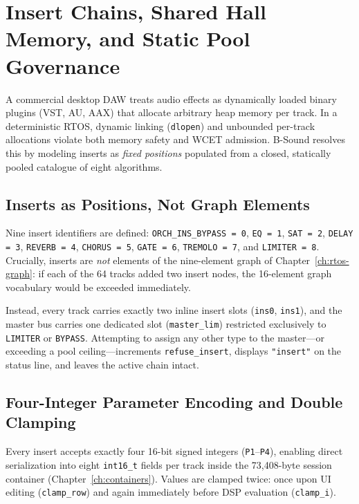 \chapter{Insert Chains, Shared Hall Memory, and Static Pool Governance}
\label{ch:inserts-hall}

A commercial desktop DAW treats audio effects as dynamically loaded binary plugins (VST, AU, AAX) that allocate arbitrary heap memory per track. In a deterministic RTOS, dynamic linking (\texttt{dlopen}) and unbounded per-track allocations violate both memory safety and WCET admission. B-Sound resolves this by modeling inserts as \emph{fixed positions} populated from a closed, statically pooled catalogue of eight algorithms.

\section{Inserts as Positions, Not Graph Elements}

Nine insert identifiers are defined: \texttt{ORCH\_INS\_BYPASS = 0}, \texttt{EQ = 1}, \texttt{SAT = 2}, \texttt{DELAY = 3}, \texttt{REVERB = 4}, \texttt{CHORUS = 5}, \texttt{GATE = 6}, \texttt{TREMOLO = 7}, and \texttt{LIMITER = 8}. Crucially, inserts are \emph{not} elements of the nine-element graph of Chapter~\ref{ch:rtos-graph}: if each of the 64 tracks added two insert nodes, the 16-element graph vocabulary would be exceeded immediately.

Instead, every track carries exactly two inline insert slots (\texttt{ins0}, \texttt{ins1}), and the master bus carries one dedicated slot (\texttt{master\_lim}) restricted exclusively to \texttt{LIMITER} or \texttt{BYPASS}. Attempting to assign any other type to the master—or exceeding a pool ceiling—increments \texttt{refuse\_insert}, displays \texttt{"insert"} on the status line, and leaves the active chain intact.

\section{Four-Integer Parameter Encoding and Double Clamping}

Every insert accepts exactly four 16-bit signed integers (\texttt{P1}--\texttt{P4}), enabling direct serialization into eight \texttt{int16\_t} fields per track inside the 73,408-byte session container (Chapter~\ref{ch:containers}). Values are clamped twice: once upon UI editing (\texttt{clamp\_row}) and again immediately before DSP evaluation (\texttt{clamp\_i}).

